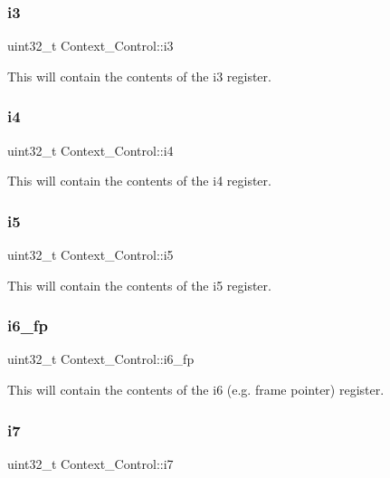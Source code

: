 \subsubsection{\texorpdfstring{i3}{i3}}
{\footnotesize\ttfamily uint32\+\_\+t Context\+\_\+\+Control\+::i3}

This will contain the contents of the i3 register. \mbox{\label{structContext__Control_a071982c5834b18f05fa2ee09112c644a}} 
\subsubsection{\texorpdfstring{i4}{i4}}
{\footnotesize\ttfamily uint32\+\_\+t Context\+\_\+\+Control\+::i4}

This will contain the contents of the i4 register. \mbox{\label{structContext__Control_a0b16ec0130ab80e0a29673f0f6d54c61}} 
\subsubsection{\texorpdfstring{i5}{i5}}
{\footnotesize\ttfamily uint32\+\_\+t Context\+\_\+\+Control\+::i5}

This will contain the contents of the i5 register. \mbox{\label{structContext__Control_ad8bcaa486249e128db09c18c8f70b097}} 
\subsubsection{\texorpdfstring{i6\_fp}{i6\_fp}}
{\footnotesize\ttfamily uint32\+\_\+t Context\+\_\+\+Control\+::i6\+\_\+fp}

This will contain the contents of the i6 (e.\+g. frame pointer) register. \mbox{\label{structContext__Control_a84a14521edc1491e9f6fba0a5a881bb1}} 
\subsubsection{\texorpdfstring{i7}{i7}}
{\footnotesize\ttfamily uint32\+\_\+t Context\+\_\+\+Control\+::i7}

